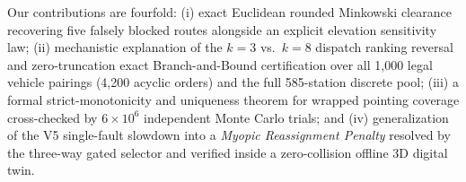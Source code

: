 Our contributions are fourfold: (i) exact Euclidean rounded Minkowski clearance recovering five falsely blocked routes alongside an explicit elevation sensitivity law; (ii) mechanistic explanation of the $k=3$ vs.\ $k=8$ dispatch ranking reversal and zero-truncation exact Branch-and-Bound certification over all 1,000 legal vehicle pairings (4,200 acyclic orders) and the full 585-station discrete pool; (iii) a formal strict-monotonicity and uniqueness theorem for wrapped pointing coverage cross-checked by $6\times 10^6$ independent Monte Carlo trials; and (iv) generalization of the V5 single-fault slowdown into a \emph{Myopic Reassignment Penalty} resolved by the three-way gated selector and verified inside a zero-collision offline 3D digital twin.
